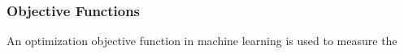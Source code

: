 \subsubsection{Objective Functions}
An optimization objective function in machine learning is used to measure the 
